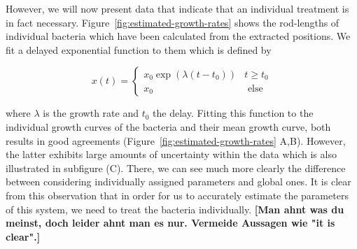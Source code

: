 \documentclass[10pt,letterpaper]{article}
\begin{document}
However, we will now present data that indicate that an individual treatment is in fact necessary.
Figure~\ref{fig:estimated-growth-rates} shows the rod-lengths of individual bacteria which have been
calculated from the extracted positions.
We fit a delayed exponential function to them which is defined by

\begin{equation}
    x(t) =
    \left\{\begin{array}{ll}
            x_0 \exp(\lambda (t-t_0)) & t\geq t_0\\
            x_0 & \text{ else}
    \end{array}\right.
\end{equation}

where $\lambda$ is the growth rate and $t_0$ the delay.
Fitting this function to the individual growth curves of the bacteria and their mean growth curve,
both results in good agreements (Figure~\ref{fig:estimated-growth-rates} A,B).
However, the latter exhibits large amounts of uncertainty within the data which is also illustrated
in subfigure (C).
There, we can see much more clearly the difference between considering individually assigned
parameters and global ones.
It is clear from this observation that in order for us to accurately estimate the parameters of this
system, we need to treat the bacteria individually.
\textbf{[Man ahnt was du meinst, doch leider ahnt man es nur. Vermeide Aussagen wie "it is clear".]}


\end{document}
